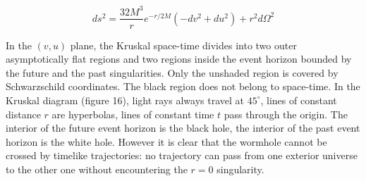 \documentclass{lamuphys}
\begin{document}
\begin{equation}
        ds^{2} = \frac{32M^3}{r} e^{-r/2M}(-dv^{2} + du^{2})+ 
        r^{2}d\Omega^{2}
        \label{luminet:14}
\end{equation}

In the $(v,u)$ plane, the Kruskal space-time divides into two outer 
asymptotically flat regions and two regions inside the event horizon 
bounded by the future and the past singularities. Only the unshaded 
region is covered by Schwarzschild coordinates. The black region does 
not belong to space-time. In the Kruskal 
diagram (figure 16), light rays  always travel at $45^{\circ}$, lines of 
constant distance $r$ are hyperbolas, lines of constant time $t$ pass 
through the origin. The interior of the 
future event horizon is the black hole, the interior of the past event 
horizon is the white hole. However it is clear that the wormhole 
cannot be crossed by timelike trajectories: no trajectory 
can pass from one exterior universe to the other one without 
encountering the $r=0$ singularity. 
\end{document}

